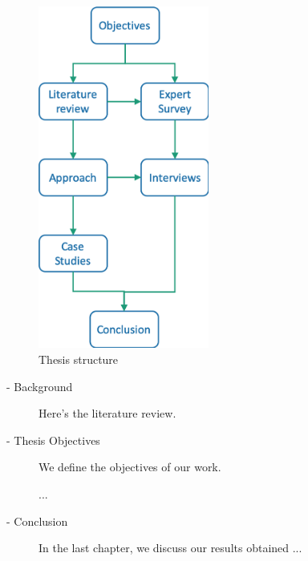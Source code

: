 \begin{figure}[htb!]
\centering \includegraphics[width=0.5\textwidth]{graphics/thesis-structure}
\caption{Thesis structure}
\label{fig:thesis-structure}
\end{figure}

\begin{description}
    \item[ - Background]
Here's the literature review.

    \item[ - Thesis Objectives]
We define the objectives of our work.

...

    \item[ - Conclusion]
In the last chapter, we discuss our results obtained ...

\end{description}